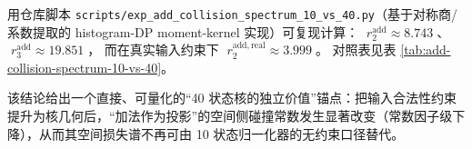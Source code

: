 \begin{remark}\label{rem:add-collision-spectrum-10-vs-40}
用仓库脚本 \texttt{scripts/exp\_add\_collision\_spectrum\_10\_vs\_40.py}（基于对称商/系数提取的 histogram-DP moment-kernel 实现）可复现计算：
\(\;r^{\mathrm{add}}_2\approx 8.743\;\)、
\(\;r^{\mathrm{add}}_3\approx 19.851\;\)，
而在真实输入约束下
\(\;r^{\mathrm{add,real}}_2\approx 3.999\;\)。
对照表见表 \ref{tab:add-collision-spectrum-10-vs-40}。


该结论给出一个直接、可量化的“40 状态核的独立价值”锚点：把输入合法性约束提升为核几何后，“加法作为投影”的空间侧碰撞常数发生显著改变（常数因子级下降），从而其空间损失谱不再可由 10 状态归一化器的无约束口径替代。
\end{remark}
